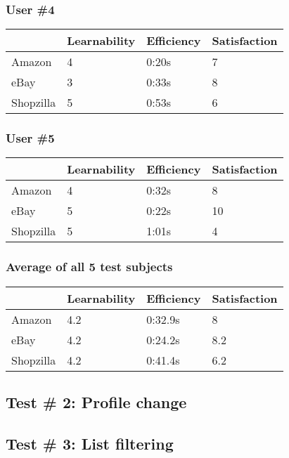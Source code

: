 \documentclass[11pt, oneside]{article}   	%
\begin{document}
\subsubsection{User \#4}

\begin{tabular}{| l | l | l | l |}
    \hline
     & Learnability & Efficiency & Satisfaction \\ \hline
    Amazon & 4 & 0:20s & 7 \\ \hline
    eBay & 3 & 0:33s & 8 \\ \hline
    Shopzilla & 5 & 0:53s & 6 \\\hline
\end{tabular}

\subsubsection{User \#5}

\begin{tabular}{| l | l | l | l |}
    \hline
     & Learnability & Efficiency & Satisfaction \\ \hline
    Amazon & 4 & 0:32s & 8 \\ \hline
    eBay & 5 & 0:22s & 10 \\ \hline
    Shopzilla & 5 & 1:01s & 4 \\\hline
\end{tabular}

\subsubsection{Average of all 5 test subjects}

\begin{tabular}{| l | l | l | l |}
    \hline
     & Learnability & Efficiency & Satisfaction \\ \hline
    Amazon & 4.2 & 0:32.9s & 8 \\ \hline
    eBay & 4.2 & 0:24.2s & 8.2 \\ \hline
    Shopzilla & 4.2 & 0:41.4s & 6.2 \\\hline
\end{tabular}

\subsection{Test \# 2: Profile change}


\subsection{Test \# 3: List filtering}
\end{document}
